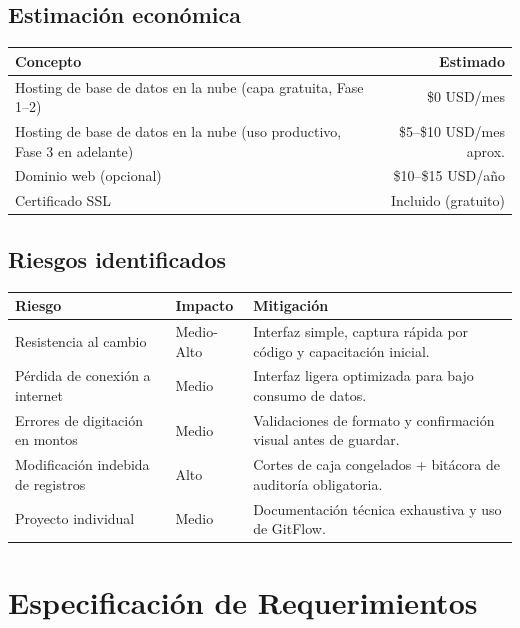 \documentclass[11pt,a4paper]{article}
\begin{document}
	\subsection{Estimación económica}
	\begin{table}[h!]
		\centering
		\renewcommand{\arraystretch}{1.2}
		\begin{tabularx}{\textwidth}{X r}
			\toprule
			\textbf{Concepto} & \textbf{Estimado} \\
			\midrule
			Hosting de base de datos en la nube (capa gratuita, Fase 1–2) & \$0 USD/mes \\
			Hosting de base de datos en la nube (uso productivo, Fase 3 en adelante) & \$5–\$10 USD/mes aprox. \\
			Dominio web (opcional) & \$10–\$15 USD/año \\
			Certificado SSL & Incluido (gratuito) \\
			\bottomrule
		\end{tabularx}
	\end{table}
	
	\subsection{Riesgos identificados}
	\begin{table}[h!]
		\centering
		\renewcommand{\arraystretch}{1.2}
		\begin{tabularx}{\textwidth}{p{4.5cm} p{2.5cm} X}
			\toprule
			\textbf{Riesgo} & \textbf{Impacto} & \textbf{Mitigación} \\
			\midrule
			Resistencia al cambio & Medio-Alto & Interfaz simple, captura rápida por código y capacitación inicial. \\
			Pérdida de conexión a internet & Medio & Interfaz ligera optimizada para bajo consumo de datos. \\
			Errores de digitación en montos & Medio & Validaciones de formato y confirmación visual antes de guardar. \\
			Modificación indebida de registros & Alto & Cortes de caja congelados + bitácora de auditoría obligatoria. \\
			Proyecto individual & Medio & Documentación técnica exhaustiva y uso de GitFlow. \\
			\bottomrule
		\end{tabularx}
	\end{table}
	
	
	\newpage
	\section{Especificación de Requerimientos}
	
\end{document}
